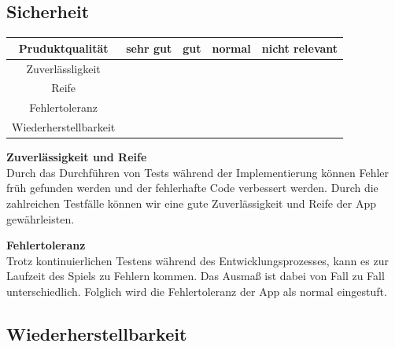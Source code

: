\documentclass[parskip=full]{scrartcl}
\begin{document}
\subsection{Sicherheit}
\begin{tabular}{| c | c | c | c | c |}
    \hline
    \textbf{Pruduktqualität} & \textbf{sehr gut} & \textbf{gut} & \textbf{normal} & \textbf{nicht relevant} \\ \hline
    Zuverlässligkeit         &                   &              &                 &                         \\ \hline
    Reife                    &                   &              &                 &                         \\ \hline
    Fehlertoleranz           &                   &              &                 &                         \\ \hline
    Wiederherstellbarkeit    &                   &              &                 &                         \\ \hline
\end{tabular}

\textbf{Zuverlässigkeit und Reife}\\
Durch das Durchführen von Tests während der Implementierung können Fehler früh gefunden werden und der fehlerhafte Code verbessert werden.
Durch die zahlreichen Testfälle können wir eine gute Zuverlässigkeit und Reife der App gewährleisten.

\textbf{Fehlertoleranz}\\
Trotz kontinuierlichen Testens während des Entwicklungsprozesses, kann es zur Laufzeit des Spiels zu Fehlern kommen.
Das Ausmaß ist dabei von Fall zu Fall unterschiedlich.
Folglich wird die Fehlertoleranz der App als normal eingestuft.

\subsection{Wiederherstellbarkeit}
\end{document}
